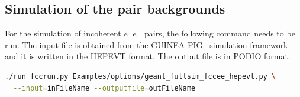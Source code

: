\subsection{Simulation of the pair backgrounds}
For the simulation of incoherent $e^+e^-$ pairs, the following command needs to be run. The input file is obtained from the \textsc{GUINEA-PIG}~\cite{Schulte:382453} simulation framework and it is written in the \textsc{HEPEVT} format. The output file is in \textsc{PODIO} format.

\begin{lstlisting}[language=bash,caption={Simulation of the incoherent pair background.}]
  ./run fccrun.py Examples/options/geant_fullsim_fccee_hepevt.py \
  --input=inFileName --outputfile=outFileName
\end{lstlisting}
